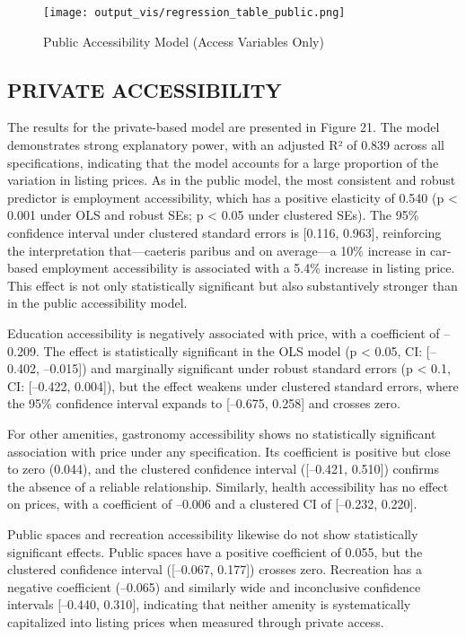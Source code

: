 \documentclass[
  12pt,
]{report}
\begin{document}
\begin{figure}[H]

{\centering \texttt{[image: output\_vis/regression\_table\_public.png]}

}

\caption{Public Accessibility Model (Access Variables Only)}

\end{figure}%

\subsection{PRIVATE ACCESSIBILITY}\label{private-accessibility}

The results for the private-based model are presented in Figure 21. The
model demonstrates strong explanatory power, with an adjusted R² of
0.839 across all specifications, indicating that the model accounts for
a large proportion of the variation in listing prices. As in the public
model, the most consistent and robust predictor is employment
accessibility, which has a positive elasticity of 0.540 (p \textless{}
0.001 under OLS and robust SEs; p \textless{} 0.05 under clustered SEs).
The 95\% confidence interval under clustered standard errors is
{[}0.116, 0.963{]}, reinforcing the interpretation that---caeteris
paribus and on average---a 10\% increase in car-based employment
accessibility is associated with a 5.4\% increase in listing price. This
effect is not only statistically significant but also substantively
stronger than in the public accessibility model.

Education accessibility is negatively associated with price, with a
coefficient of --0.209. The effect is statistically significant in the
OLS model (p \textless{} 0.05, CI: {[}--0.402, --0.015{]}) and
marginally significant under robust standard errors (p \textless{} 0.1,
CI: {[}--0.422, 0.004{]}), but the effect weakens under clustered
standard errors, where the 95\% confidence interval expands to
{[}--0.675, 0.258{]} and crosses zero.

For other amenities, gastronomy accessibility shows no statistically
significant association with price under any specification. Its
coefficient is positive but close to zero (0.044), and the clustered
confidence interval ({[}--0.421, 0.510{]}) confirms the absence of a
reliable relationship. Similarly, health accessibility has no effect on
prices, with a coefficient of --0.006 and a clustered CI of {[}--0.232,
0.220{]}.

Public spaces and recreation accessibility likewise do not show
statistically significant effects. Public spaces have a positive
coefficient of 0.055, but the clustered confidence interval ({[}--0.067,
0.177{]}) crosses zero. Recreation has a negative coefficient (--0.065)
and similarly wide and inconclusive confidence intervals {[}--0.440,
0.310{]}, indicating that neither amenity is systematically capitalized
into listing prices when measured through private access.
\end{document}
